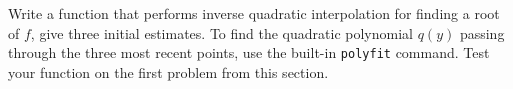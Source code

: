 \begin{statement}{2}
  Write a function that performs inverse quadratic interpolation for
  finding a root of $f$, give three initial estimates.
  To find the quadratic polynomial $q(y)$ passing through the three most recent points,
  use the built-in \texttt{polyfit} command.
  Test your function on the first problem from this section.
\end{statement}